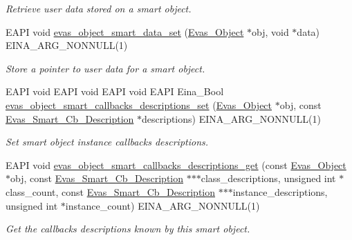 \begin{DoxyCompactItemize}
\begin{DoxyCompactList}\small\item\em Retrieve user data stored on a smart object. \item\end{DoxyCompactList}\item 
EAPI void \hyperlink{group__Evas__Smart__Object__Group_gae40928b2993cc169e606820ae21dbb6e}{evas\_\-object\_\-smart\_\-data\_\-set} (\hyperlink{group__Evas__Object__Group_ga9e19e6dd1f517a0ba437c0114d3e7c97}{Evas\_\-Object} $\ast$obj, void $\ast$data) EINA\_\-ARG\_\-NONNULL(1)
\begin{DoxyCompactList}\small\item\em Store a pointer to user data for a smart object. \item\end{DoxyCompactList}\item 
EAPI void EAPI void EAPI void EAPI Eina\_\-Bool \hyperlink{group__Evas__Smart__Object__Group_gaf724dbb075cdaf2b4b44dd883b792dc3}{evas\_\-object\_\-smart\_\-callbacks\_\-descriptions\_\-set} (\hyperlink{group__Evas__Object__Group_ga9e19e6dd1f517a0ba437c0114d3e7c97}{Evas\_\-Object} $\ast$obj, const \hyperlink{struct__Evas__Smart__Cb__Description}{Evas\_\-Smart\_\-Cb\_\-Description} $\ast$descriptions) EINA\_\-ARG\_\-NONNULL(1)
\begin{DoxyCompactList}\small\item\em Set smart object instance callbacks descriptions. \item\end{DoxyCompactList}\item 
EAPI void \hyperlink{group__Evas__Smart__Object__Group_gaf58d78bc21229defb9eafd541063391d}{evas\_\-object\_\-smart\_\-callbacks\_\-descriptions\_\-get} (const \hyperlink{group__Evas__Object__Group_ga9e19e6dd1f517a0ba437c0114d3e7c97}{Evas\_\-Object} $\ast$obj, const \hyperlink{struct__Evas__Smart__Cb__Description}{Evas\_\-Smart\_\-Cb\_\-Description} $\ast$$\ast$$\ast$class\_\-descriptions, unsigned int $\ast$class\_\-count, const \hyperlink{struct__Evas__Smart__Cb__Description}{Evas\_\-Smart\_\-Cb\_\-Description} $\ast$$\ast$$\ast$instance\_\-descriptions, unsigned int $\ast$instance\_\-count) EINA\_\-ARG\_\-NONNULL(1)
\begin{DoxyCompactList}\small\item\em Get the callbacks descriptions known by this smart object. \item\end{DoxyCompactList}\item 

\end{DoxyCompactItemize}
